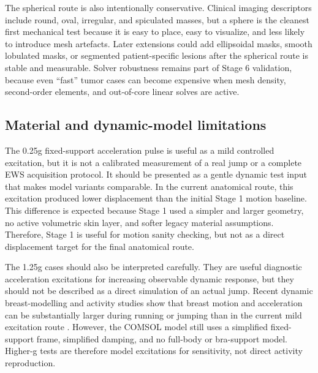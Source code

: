 The spherical route is also intentionally conservative. Clinical imaging descriptors include round, oval, irregular, and spiculated masses, but a sphere is the cleanest first mechanical test because it is easy to place, easy to visualize, and less likely to introduce mesh artefacts. Later extensions could add ellipsoidal masks, smooth lobulated masks, or segmented patient-specific lesions after the spherical route is stable and measurable. Solver robustness remains part of Stage 6 validation, because even ``fast'' tumor cases can become expensive when mesh density, second-order elements, and out-of-core linear solves are active.

\subsection{Material and dynamic-model limitations}

The 0.25g fixed-support acceleration pulse is useful as a mild controlled excitation, but it is not a calibrated measurement of a real jump or a complete EWS acquisition protocol. It should be presented as a gentle dynamic test input that makes model variants comparable. In the current anatomical route, this excitation produced lower displacement than the initial Stage 1 motion baseline. This difference is expected because Stage 1 used a simpler and larger geometry, no active volumetric skin layer, and softer legacy material assumptions. Therefore, Stage 1 is useful for motion sanity checking, but not as a direct displacement target for the final anatomical route.

The 1.25g cases should also be interpreted carefully. They are useful diagnostic acceleration excitations for increasing observable dynamic response, but they should not be described as a direct simulation of an actual jump. Recent dynamic breast-modelling and activity studies show that breast motion and acceleration can be substantially larger during running or jumping than in the current mild excitation route \cite{Chen2024,Chen2025}. However, the COMSOL model still uses a simplified fixed-support frame, simplified damping, and no full-body or bra-support model. Higher-g tests are therefore model excitations for sensitivity, not direct activity reproduction.

